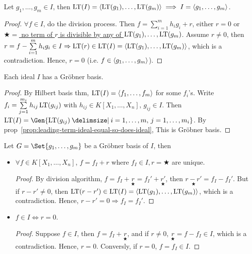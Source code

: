 \begin{prop} \label{prop:leading-term-ideal-equal-so-does-ideal}
  Let $g_1, \dots, g_m \in I$, then
  $\operatorname{LT}(I) = \langle\operatorname{LT}(g_1),\dots,\operatorname{LT}(g_m)\rangle \implies I = \langle g_1,\dots,g_m\rangle$.
  \begin{proof}
    $\forall f \in I$, do the division process. Then
    $f = \sum\limits_{i=1}^m h_ig_i+r$, either $r=0$ or
    \uline{$\bigstar =$ no term of $r$ is divisible by any of
    $\operatorname{LT}(g_1),\dots,\operatorname{LT}(g_m)$}. Assume $r \neq 0$, then
    $r = f - \sum\limits_{i=1}^m h_i g_i \in I \Rightarrow \operatorname{LT}(r) \in \operatorname{LT}(I) =
    \langle \operatorname{LT}(g_1),\dots, \operatorname{LT}(g_m) \rangle$, which is a contradiction.
    Hence, $r = 0$ (i.e. $f\in \langle g_1,\dots,g_m \rangle$).
  \end{proof}
\end{prop}

\begin{theorem} \label{thm:Grobner-existense}
  Each ideal $I$ has a Gr\"{o}bner basis.
  \begin{proof}
    By Hilbert basis thm, $\operatorname{LT}(I) = \langle f_1,\dots,f_m \rangle$ for some $f_i$'s.
    Write $f_i = \sum\limits_{j=1}^{m_i} h_{ij}\operatorname{LT}(g_{ij})$ with
    $h_{ij} \in K[X_1,\dots,X_n]$, $g_{ij} \in I$. Then
    $\LT(I) = \Gen{ \LT(g_{ij}) \given i=1,\dots,m,\, j=1,\dots,m_i}$.
    By prop~\ref{prop:leading-term-ideal-equal-so-does-ideal}, 
    This is Gr\"{o}bner basis.
  \end{proof}
\end{theorem}

\begin{theorem} \label{thm:Grobner-property}
  Let $G = \Set{g_1,\dots,g_m}$ be a Gr\"{o}bner basis of $I$, then
  \begin{itemize}
    \item $\forall f \in K[X_1,\dots,X_n]$, $f = f_I + r$ where
      $f_I \in I, r = \bigstar$ are unique.
      \begin{proof}
        By division algorithm, $f = f_I +\underset{\bigstar}{r} =
        f_I'+\underset{\bigstar}{r'}$, then $\underset{\bigstar}{r-r'} = f_I-f_I'$.
        But if $r-r' \neq 0$, then $\operatorname{LT}(r-r') \in \operatorname{LT}(I) =
        \langle \operatorname{LT}(g_1),\dots,\operatorname{LT}(g_m) \rangle$, which is a contradiction.
        Hence, $r-r' = 0\Rightarrow f_I = f_I'$.
      \end{proof}
    \item $f \in I \iff r=0$.
      \begin{proof}
        Suppose $f \in I$, then $f = f_I + \underset{\bigstar}{r}$, and if $r\neq 0$,
        $\underset{\bigstar}{r} = f - f_I\in I$, which is a contradiction.
        Hence, $r = 0$. Conversly, if $r = 0$, $f = f_I \in I$. 
      \end{proof}
  \end{itemize}
\end{theorem}


